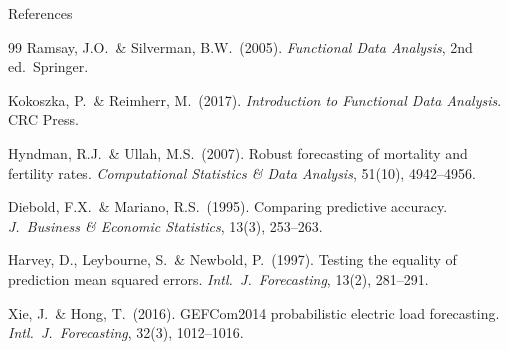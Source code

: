 \documentclass[10pt,aspectratio=169]{beamer}
\begin{document}
\begin{frame}{References}
  \footnotesize
  \begin{thebibliography}{99}
    Ramsay, J.O.\ \& Silverman, B.W.\ (2005).
    \textit{Functional Data Analysis}, 2nd ed.\ Springer.

    Kokoszka, P.\ \& Reimherr, M.\ (2017).
    \textit{Introduction to Functional Data Analysis}. CRC Press.

    Hyndman, R.J.\ \& Ullah, M.S.\ (2007).
    Robust forecasting of mortality and fertility rates.
    \textit{Computational Statistics \& Data Analysis}, 51(10), 4942--4956.

    Diebold, F.X.\ \& Mariano, R.S.\ (1995).
    Comparing predictive accuracy.
    \textit{J.\ Business \& Economic Statistics}, 13(3), 253--263.

    Harvey, D., Leybourne, S.\ \& Newbold, P.\ (1997).
    Testing the equality of prediction mean squared errors.
    \textit{Intl.\ J.\ Forecasting}, 13(2), 281--291.

    Xie, J.\ \& Hong, T.\ (2016).
    GEFCom2014 probabilistic electric load forecasting.
    \textit{Intl.\ J.\ Forecasting}, 32(3), 1012--1016.
  \end{thebibliography}
\end{frame}
\end{document}

